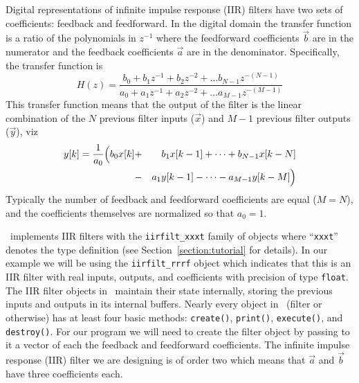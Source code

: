 Digital representations of infinite impulse response (IIR) filters have
two sets of coefficients: feedback and feedforward.
In the digital domain the transfer function is a ratio of the
polynomials in $z^{-1}$ where the
feedforward coefficients $\vec{b}$ are in the numerator and the
feedback coefficients $\vec{a}$ are in the denominator.
Specifically, the transfer function is
%
\begin{equation}
    H(z) =
        \frac{
            b_0 + b_1 z^{-1} + b_2 z^{-2} + \ldots b_{N-1}z^{-(N-1)}
        }{
            a_0 + a_1 z^{-1} + a_2 z^{-2} + \ldots a_{M-1}z^{-(M-1)}
        }
\end{equation}
%
This transfer function means that the output of the filter is the linear
combination of the $N$ previous filter inputs ($\vec{x}$)
and $M-1$ previous filter outputs ($\vec{y}$), viz
%
\begin{eqnarray}
    y[k] =
        \frac{1}{a_0}
        \Bigl(
            b_0 x[k] &+& b_1 x[k-1] + \cdots + b_{N-1} x[k-N]\\
                     &-& a_1 y[k-1] - \cdots - a_{M-1} y[k-M]
        \Bigr)
\end{eqnarray}
%
Typically the number of feedback and feedforward coefficients are equal
($M=N$), and the coefficients themselves are normalized so that $a_0=1$.

\liquid\ implements IIR filters with the {\tt iirfilt\_xxxt} family of
objects where ``{\tt xxxt}'' denotes the type definition
(see Section~\ref{section:tutorial} for details).
In our example we will be using the {\tt iirfilt\_rrrf} object which
indicates that this is an IIR filter with real inputs, outputs, and
coefficients with precision of type {\tt float}.
The IIR filter objects in \liquid\ maintain their state
internally, storing the previous inputs and outputs in its internal
buffers.
Nearly every object in \liquid\ (filter or otherwise) has at least four
basic methods:
{\tt create()},
{\tt print()},
{\tt execute()}, and
{\tt destroy()}.
For our program we will need to create the filter object by passing to
it a vector of each the feedback and feedforward coefficients.
The infinite impulse response (IIR) filter we are designing is of order
two which means that $\vec{a}$ and $\vec{b}$ have three coefficients
each.

